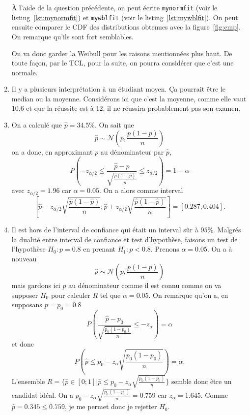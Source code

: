 \begin{enumerate}
    À l'aide de la question précédente, on peut écrire
    \lstinline|mynormfit| (voir le listing~\ref{lst:mynormfit}) et
    \lstinline|mywblfit| (voir le listing~\ref{lst:mywblfit}).
    On peut ensuite comparer le CDF des distributions obtenues
    avec la figure~\ref{fig:cmp}.
    On remarque qu'ils sont fort semblables.

    On va donc garder la Weibull pour les raisons mentionnées plus haut.
    De toute façon, par le TCL, pour la suite,
    on pourra considérer que c'est une normale.
  \item
    Il y a plusieurs interprétation à un étudiant moyen.
    Ça pourrait être le median ou la moyenne.
    Considérons ici que c'est la moyenne, comme elle vaut 10.6 et que la réussite est à 12,
    il ne réussira probablement pas son examen.
  \item On a calculé que $\hat{p} = \si{34.5}{\%}$.
    On sait que
    \[ \hat{p} \sim \mathcal{N}(p,\frac{p(1-p)}{n}) \]
    on a donc, en approximant $p$ au dénominateur par $\hat{p}$,
    \[ P(-z_{\alpha/2} \leq \frac{\hat{p}-p}{\sqrt{\frac{\hat{p}(1-\hat{p})}{n}}}
    \leq z_{\alpha/2}) = 1-\alpha \]
    avec $z_{\alpha/2} = 1.96$ car $\alpha = 0.05$.
    On a alors comme interval
    \[ \left[\hat{p}-z_{\alpha/2}\sqrt{\frac{\hat{p}(1-\hat{p})}{n}};
    \hat{p}+z_{\alpha/2}\sqrt{\frac{\hat{p}(1-\hat{p})}{n}}\right] =
    [0.287; 0.404].
    \]
  \item
    Il est hors de l'interval de confiance qui était un
    interval sûr à $\si{95}{\%}$.
    Malgrés la dualité entre interval de confiance et
    test d'hypothèse,
    faisons un test de l'hypothèse $H_0: p = 0.8$
    en prenant $H_1: p < 0.8$.
    Prenons $\alpha = 0.05$.
    On a à nouveau
    \[ \hat{p} \sim \mathcal{N}(p,\frac{p(1-p)}{n}) \]
    mais gardons ici $p$ au dénominateur comme il est connu
    comme on va supposer $H_0$ pour calculer $R$ tel que
    $\alpha = 0.05$.
    On remarque qu'on a, en supposans $p = p_0 = 0.8$
    \[ P(\frac{\hat{p}-p_0}{\sqrt{\frac{p_0(1-p_0)}{n}}}
    \leq -z_{\alpha}) = \alpha \]
    et donc
    \[ P(\hat{p} \leq p_0-z_{\alpha}\sqrt{\frac{p_0(1-p_0)}{n}}) = \alpha. \]
    L'ensemble $R = \{\hat{p} \in [0;1] | \hat{p} \leq p_0-z_{\alpha}\sqrt{\frac{p_0(1-p_0)}{n}}\}$
    semble donc être un candidat idéal.
    On a $p_0-z_{\alpha}\sqrt{\frac{p_0(1-p_0)}{n}} = 0.759$
    car $z_\alpha = 1.645$.
    Comme $\hat{p} = 0.345 \leq 0.759$, je me permet donc je rejetter
    $H_0$.
\end{enumerate}
